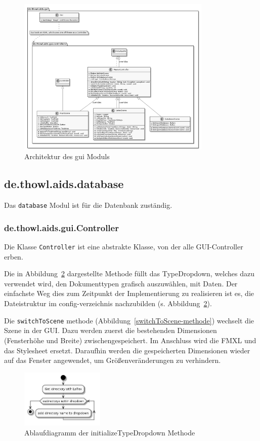 \documentclass[stu, a4paper, 11pt, floatsintext]{apa7}
\begin{document}
\begin{figure}[!htbp]
\centering
\includegraphics[width=350px]{../technical_documentation/diagramm/uml/flowcharts/gui/gui.png}
\caption{\label{gui Architektur}Architektur des gui Moduls}
\end{figure}

\subsection{de.thowl.aids.database}
\noindent Das \texttt{database} Modul ist für die Datenbank zuständig.

\subsubsection{de.thowl.aids.gui.Controller}
\noindent Die Klasse \texttt{Controller} ist eine abstrakte Klasse, von der alle GUI-Controller erben.

Die in Abbildung~\ref{initializeTypeDropdown-methode} dargestellte Methode füllt das TypeDropdown, welches dazu verwendet wird, den Dokumenttypen grafisch auszuwählen, mit Daten.
Der einfachste Weg dies zum Zeitpunkt der Implementierung zu realisieren ist es, die Dateistruktur im config-verzeichnis nachzubilden (s. Abbildung~\ref{initializeTypeDropdown-methode}).

Die \texttt{switchToScene} methode (Abbildung~\ref{switchToScene-methode}) wechselt die Szene in der GUI.
Dazu werden zuerst die bestehenden Dimensionen (Fensterhöhe und Breite) zwischengespeichert.
Im Anschluss wird die FMXL und das Stylesheet ersetzt. Daraufhin werden die gespeicherten Dimensionen wieder auf das Fenster angewendet, um Größenveränderungen zu verhindern.

\begin{figure}[!htbp]
\centering
\includegraphics[width=150px]{../technical_documentation/diagramm/uml/flowcharts/gui/controller/initialiseTypeDropdown.png}
\caption{\label{initializeTypeDropdown-methode}Ablaufdiagramm der initializeTypeDropdown Methode}
\end{figure}
\end{document}
